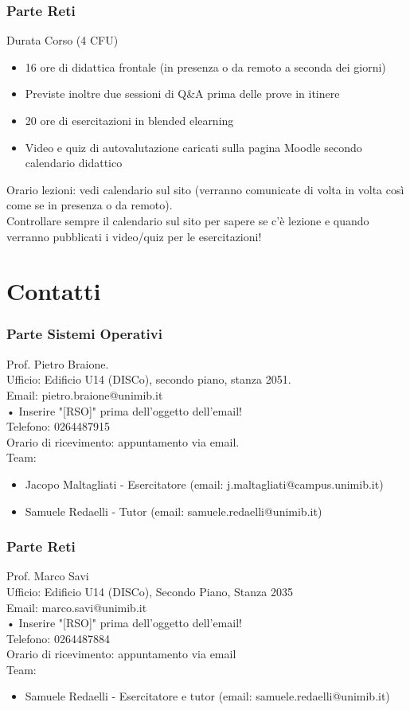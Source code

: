 \subsubsection{Parte Reti}
Durata Corso (4 CFU)
\begin{itemize}
    \item 16 ore di didattica frontale (in presenza o da remoto a seconda dei giorni)
    \item Previste inoltre due sessioni di Q&A prima delle prove in itinere
    \item 20 ore di esercitazioni in blended elearning
    \item Video e quiz di autovalutazione caricati sulla pagina Moodle secondo calendario didattico
\end{itemize}
Orario lezioni: vedi calendario sul sito (verranno comunicate di volta in volta così come se in presenza o da remoto).\\
Controllare sempre il calendario sul sito per sapere se c'è lezione e quando verranno pubblicati i video/quiz per le esercitazioni!

\section{Contatti}
\subsubsection{Parte Sistemi Operativi}
Prof. Pietro Braione.\\
Ufficio: Edificio U14 (DISCo), secondo piano, stanza 2051.\\
Email: pietro.braione@unimib.it\\
• Inserire "[RSO]" prima dell'oggetto dell'email!\\
Telefono: 0264487915\\
Orario di ricevimento: appuntamento via email.\\
Team:
\begin{itemize}
    \item Jacopo Maltagliati - Esercitatore (email: j.maltagliati@campus.unimib.it)
    \item Samuele Redaelli - Tutor (email: samuele.redaelli@unimib.it) 
\end{itemize}

\subsubsection{Parte Reti}
Prof. Marco Savi\\
Ufficio: Edificio U14 (DISCo), Secondo Piano, Stanza 2035\\
Email: marco.savi@unimib.it\\
• Inserire "[RSO]" prima dell'oggetto dell'email!\\
Telefono: 0264487884\\
Orario di ricevimento: appuntamento via email\\
Team:
\begin{itemize}
    \item Samuele Redaelli - Esercitatore e tutor (email: samuele.redaelli@unimib.it) 
\end{itemize}

